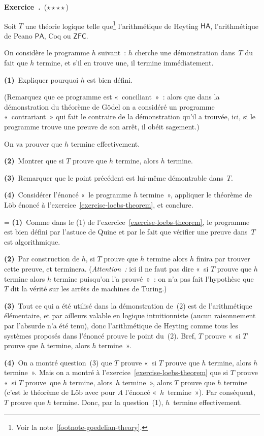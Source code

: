 \documentclass[12pt,a4paper]{article}
\theoremstyle{definition}
\newcommand\exercice{%
\refstepcounter{comcnt}\bigskip\noindent\textbf{Exercice~\thecomcnt.}}
\newif\ifcorrige
\newenvironment{corrige}%
{\ifcorrige\relax\else\setbox0=\vbox\bgroup\fi%
\smallbreak\footnotesize\noindent{\underbar{\textit{Corrigé.}}\quad}}
{{\hbox{}\nobreak\hfill\checkmark}%
\ifcorrige\relax\else\egroup\fi\par}
\begin{document}
%

\exercice\ (${\star}{\star}{\star}{\star}$)\par\nobreak

Soit $T$ une théorie logique telle que\footnote{Voir la
note \ref{footnote-goedelian-theory}.}  l'arithmétique de Heyting
$\mathsf{HA}$, l'arithmétique de Peano $\mathsf{PA}$, Coq ou
$\mathsf{ZFC}$.

On considère le programme $h$ suivant : $h$ cherche une démonstration
dans $T$ du fait que $h$ termine, et s'il en trouve une, il termine
immédiatement.

\textbf{(1)} Expliquer pourquoi $h$ est bien défini.

(Remarquez que ce programme est « conciliant » : alors que dans la
démonstration du théorème de Gödel on a considéré un programme
« contrariant » qui fait le contraire de la démonstration qu'il a
trouvée, ici, si le programme trouve une preuve de son arrêt, il obéit
sagement.)

On va prouver que $h$ termine effectivement.

\textbf{(2)} Montrer que si $T$ prouve que $h$ termine, alors $h$
termine.

\textbf{(3)} Remarquer que le point précédent est lui-même démontrable
dans $T$.

\textbf{(4)} Considérer l'énoncé « le programme $h$ termine »,
appliquer le théorème de Löb énoncé à
l'exercice \ref{exercise-loebs-theorem}, et conclure.

\begin{corrige}
\textbf{(1)} Comme dans le (1) de
l'exercice \ref{exercise-loebs-theorem}, le programme est bien défini
par l'astuce de Quine et par le fait que vérifier une preuve dans $T$
est algorithmique.

\textbf{(2)} Par construction de $h$, si $T$ prouve que $h$ termine
alors $h$ finira par trouver cette preuve, et terminera.
(\emph{Attention :} ici il ne faut pas dire « si $T$ prouve que $h$
termine alors $h$ termine puisqu'on l'a prouvé » : on n'a pas fait
l'hypothèse que $T$ dit la vérité sur les arrêts de machines de
Turing.)

\textbf{(3)} Tout ce qui a été utilisé dans la démonstration de (2)
est de l'arithmétique élémentaire, et par ailleurs valable en logique
intuitionniste (aucun raisonnement par l'absurde n'a été tenu), donc
l'arithmétique de Heyting comme tous les systèmes proposés dans
l'énoncé prouve le point du (2).  Bref, $T$ prouve « si $T$ prouve que
$h$ termine, alors $h$ termine ».

\textbf{(4)} On a montré question (3) que $T$ prouve « si $T$ prouve
que $h$ termine, alors $h$ termine ».  Mais on a montré à
l'exercice \ref{exercise-loebs-theorem} que si $T$ prouve « si $T$
prouve que $h$ termine, alors $h$ termine », alors $T$ prouve que $h$
termine (c'est le théorème de Löb avec pour $A$ l'énoncé
« $h$ termine »).  Par conséquent, $T$ prouve que $h$ termine.  Donc,
par la question (1), $h$ termine effectivement.
\end{corrige}
\end{document}
